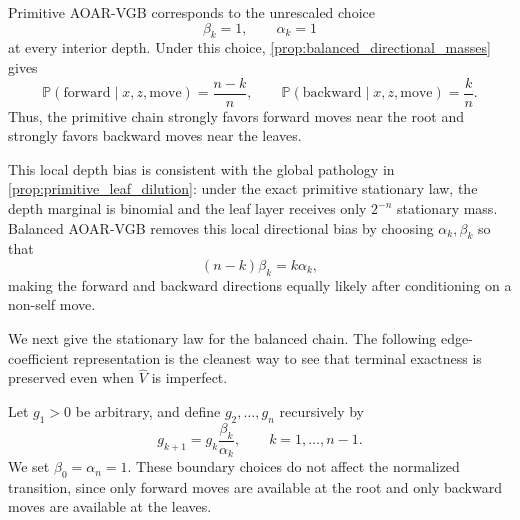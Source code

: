 \documentclass{article}
\numberwithin{theorem}{section}
\numberwithin{proposition}{section}
\numberwithin{corollary}{section}
\numberwithin{lemma}{section}
\numberwithin{conjecture}{section}
\numberwithin{remark}{section}
\numberwithin{definition}{section}
\numberwithin{assumption}{section}
\numberwithin{example}{section}
\newcommand{\bbP}{\mathbb{P}}
\begin{document}
\begin{remark}
\label{rem:primitive_vs_balanced_directional_bias}
Primitive AOAR-VGB corresponds to the unrescaled choice
\begin{equation*}
    \beta_k=1,\qquad \alpha_k=1
\end{equation*}
at every interior depth. Under this choice, \cref{prop:balanced_directional_masses} gives
\begin{equation*}
    \bbP(\mathrm{forward}\mid x,z,\mathrm{move})=\frac{n-k}{n}, \qquad
    \bbP(\mathrm{backward}\mid x,z,\mathrm{move})=\frac{k}{n}.
\end{equation*}
Thus, the primitive chain strongly favors forward moves near the root and strongly favors backward moves near the leaves.

This local depth bias is consistent with the global pathology in \cref{prop:primitive_leaf_dilution}: under the exact primitive stationary law, the depth marginal is binomial and the leaf layer receives only $2^{-n}$ stationary mass. Balanced AOAR-VGB removes this local directional bias by choosing $\alpha_k,\beta_k$ so that
\begin{equation*}
    (n-k)\beta_k=k\alpha_k,
\end{equation*}
making the forward and backward directions equally likely after conditioning on a non-self move.
\end{remark}

We next give the stationary law for the balanced chain. The following edge-coefficient representation is the cleanest way to see that terminal exactness is preserved even when $\widehat V$ is imperfect.

Let $g_1>0$ be arbitrary, and define $g_2,\dots,g_n$ recursively by
\begin{equation*}
    g_{k+1} = g_k \frac{\beta_k}{\alpha_k}, \qquad k=1,\dots,n-1.
\end{equation*}
We set $\beta_0=\alpha_n=1$. These boundary choices do not affect the normalized transition, since only forward moves are available at the root and only backward moves are available at the leaves.
\end{document}
